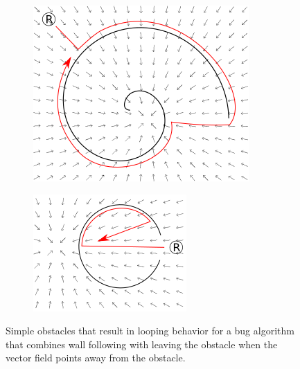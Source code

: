 \begin{figure}
	\centering
	\begin{subfigure}{0.45\textwidth}
		\includegraphics[width=\linewidth]{../spiral_trap.png}
	\end{subfigure}
	\begin{subfigure}{0.45\textwidth}
		\includegraphics[width=\linewidth]{../wall_follow_trap.png}
	\end{subfigure}
	\caption{Simple obstacles that result in looping behavior for a bug algorithm that combines wall following with leaving the obstacle when the vector field points away from the obstacle.}
	\label{traps_for_wall_follow}
\end{figure}

